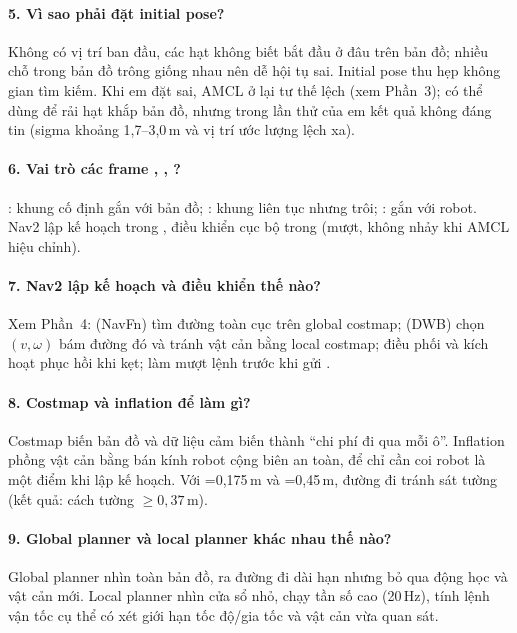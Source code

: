 \paragraph{5. Vì sao phải đặt initial pose?} Không có vị trí ban đầu, các hạt không biết bắt đầu ở đâu trên bản đồ; nhiều chỗ trong bản đồ trông giống nhau nên dễ hội tụ sai. Initial pose thu hẹp không gian tìm kiếm.
Khi em đặt sai, AMCL ở lại tư thế lệch (xem Phần~3); có thể dùng  để rải hạt khắp bản đồ, nhưng trong lần thử của em kết quả không đáng tin (sigma khoảng 1,7--3,0\,m và vị trí ước lượng lệch xa).

\paragraph{6. Vai trò các frame , , ?} : khung cố định gắn với bản đồ; : khung liên tục nhưng trôi; : gắn với robot.
Nav2 lập kế hoạch trong , điều khiển cục bộ trong  (mượt, không nhảy khi AMCL hiệu chỉnh).

\paragraph{7. Nav2 lập kế hoạch và điều khiển thế nào?} Xem Phần~4:  (NavFn) tìm đường toàn cục trên global costmap;  (DWB) chọn $(v,\omega)$ bám đường đó và tránh vật cản bằng local costmap;
 điều phối và kích hoạt phục hồi khi kẹt;  làm mượt lệnh trước khi gửi .

\paragraph{8. Costmap và inflation để làm gì?} Costmap biến bản đồ và dữ liệu cảm biến thành ``chi phí đi qua mỗi ô''. Inflation phồng vật cản bằng bán kính robot cộng biên an toàn, để chỉ cần coi robot là một điểm khi lập kế hoạch. Với =0,175\,m và =0,45\,m, đường đi tránh sát tường (kết quả: cách tường $\ge 0{,}37$\,m).

\paragraph{9. Global planner và local planner khác nhau thế nào?} Global planner nhìn toàn bản đồ, ra đường đi dài hạn nhưng bỏ qua động học và vật cản mới. Local planner nhìn cửa sổ nhỏ, chạy tần số cao (20\,Hz), tính lệnh vận tốc cụ thể có xét giới hạn tốc độ/gia tốc và vật cản vừa quan sát.

